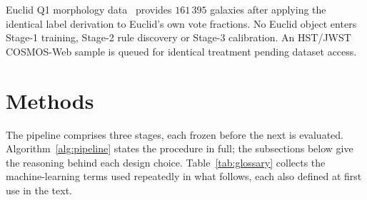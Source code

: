\documentclass[11pt]{article}
\begin{document}
Euclid Q1 morphology data~\citep{euclid2025morphology} provides $161\,395$
galaxies after applying the identical label derivation to Euclid's own vote
fractions. No Euclid object enters Stage-1 training, Stage-2 rule discovery or
Stage-3 calibration. An HST/JWST COSMOS-Web sample is queued for identical
treatment pending dataset access.

\section{Methods}
\label{sec:methods}

The pipeline comprises three stages, each frozen before the next is evaluated.
Algorithm~\ref{alg:pipeline} states the procedure in full; the subsections
below give the reasoning behind each design choice. Table~\ref{tab:glossary}
collects the machine-learning terms used repeatedly in what follows, each also
defined at first use in the text.
\end{document}
